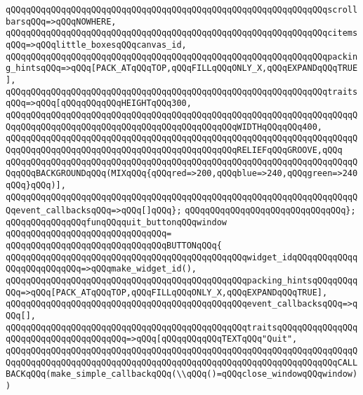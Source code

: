\verb|qQQqqQQqqQQqqQQqqQQqqQQqqQQqqQQqqQQqqQQqqQQqqQQqqQQqqQQqqQQqqQQqscrollbarsqQQq=>qQQqNOWHERE,|\newline
\verb|qQQqqQQqqQQqqQQqqQQqqQQqqQQqqQQqqQQqqQQqqQQqqQQqqQQqqQQqqQQqqQQqcitemsqQQq=>qQQqlittle_boxesqQQqcanvas_id,|\newline
\verb|qQQqqQQqqQQqqQQqqQQqqQQqqQQqqQQqqQQqqQQqqQQqqQQqqQQqqQQqqQQqqQQqpacking_hintsqQQq=>qQQq[PACK_ATqQQqTOP,qQQqFILLqQQqONLY_X,qQQqEXPANDqQQqTRUE],|\newline
\verb|qQQqqQQqqQQqqQQqqQQqqQQqqQQqqQQqqQQqqQQqqQQqqQQqqQQqqQQqqQQqqQQqtraitsqQQq=>qQQq[qQQqqQQqqQQqHEIGHTqQQq300,|\newline
\verb|qQQqqQQqqQQqqQQqqQQqqQQqqQQqqQQqqQQqqQQqqQQqqQQqqQQqqQQqqQQqqQQqqQQqqQQqqQQqqQQqqQQqqQQqqQQqqQQqqQQqqQQqqQQqqQQqqQQqWIDTHqQQqqQQq400,|\newline
\verb|qQQqqQQqqQQqqQQqqQQqqQQqqQQqqQQqqQQqqQQqqQQqqQQqqQQqqQQqqQQqqQQqqQQqqQQqqQQqqQQqqQQqqQQqqQQqqQQqqQQqqQQqqQQqqQQqqQQqRELIEFqQQqGROOVE,qQQq|\newline
\verb|qQQqqQQqqQQqqQQqqQQqqQQqqQQqqQQqqQQqqQQqqQQqqQQqqQQqqQQqqQQqqQQqqQQqqQQqqQQqBACKGROUNDqQQq(MIXqQQq{qQQqred=>200,qQQqblue=>240,qQQqgreen=>240qQQq}qQQq)],|\newline
\verb|qQQqqQQqqQQqqQQqqQQqqQQqqQQqqQQqqQQqqQQqqQQqqQQqqQQqqQQqqQQqqQQqqQQqqQQqevent_callbacksqQQq=>qQQq[]qQQq};|\newline
\verb|qQQqqQQqqQQqqQQqqQQqqQQqqQQqqQQq};|\newline
\newline
\newline
\verb|qQQqqQQqqQQqqQQqfunqQQqquit_buttonqQQqwindow|\newline
\verb|qQQqqQQqqQQqqQQqqQQqqQQqqQQqqQQq=|\newline
\verb|qQQqqQQqqQQqqQQqqQQqqQQqqQQqqQQqBUTTONqQQq{|\newline
\verb|qQQqqQQqqQQqqQQqqQQqqQQqqQQqqQQqqQQqqQQqqQQqqQQqwidget_idqQQqqQQqqQQqqQQqqQQqqQQqqQQq=>qQQqmake_widget_id(),|\newline
\verb|qQQqqQQqqQQqqQQqqQQqqQQqqQQqqQQqqQQqqQQqqQQqqQQqpacking_hintsqQQqqQQqqQQq=>qQQq[PACK_ATqQQqTOP,qQQqFILLqQQqONLY_X,qQQqEXPANDqQQqTRUE],|\newline
\verb|qQQqqQQqqQQqqQQqqQQqqQQqqQQqqQQqqQQqqQQqqQQqqQQqevent_callbacksqQQq=>qQQq[],|\newline
\verb|qQQqqQQqqQQqqQQqqQQqqQQqqQQqqQQqqQQqqQQqqQQqqQQqtraitsqQQqqQQqqQQqqQQqqQQqqQQqqQQqqQQqqQQqqQQq=>qQQq[qQQqqQQqqQQqTEXTqQQq"Quit",|\newline
\verb|qQQqqQQqqQQqqQQqqQQqqQQqqQQqqQQqqQQqqQQqqQQqqQQqqQQqqQQqqQQqqQQqqQQqqQQqqQQqqQQqqQQqqQQqqQQqqQQqqQQqqQQqqQQqqQQqqQQqqQQqqQQqqQQqqQQqqQQqCALLBACKqQQq(make_simple_callbackqQQq(\\qQQq()=qQQqclose_windowqQQqwindow))|\newline
